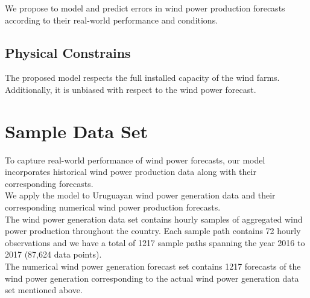 \documentclass[ima, 25pt, portrait, plainboxedsections]{sciposter}
\begin{document}
\begin{multicols}{3}
We propose to model and predict errors in wind power production forecasts according to their real-world performance and conditions.


\subsection*{Physical Constrains} The proposed model respects the full installed capacity of the wind farms. Additionally, it is  unbiased with respect to the wind power forecast.

\section*{Sample Data Set}
To capture real-world performance of  wind power forecasts, our model incorporates historical wind power production data along with their corresponding forecasts.\\

We apply the model to Uruguayan wind power generation data and their corresponding numerical wind power production forecasts. \\

The wind power generation data set contains hourly samples of aggregated wind power production throughout the country. Each sample path contains 72 hourly observations and we have a total of 1217 sample paths spanning the year 2016 to 2017 (87,624 data points). \\

The numerical wind power generation forecast set contains  1217 forecasts of the wind power generation  corresponding to the actual  wind power generation data set mentioned above.


\end{multicols}
\end{document}
